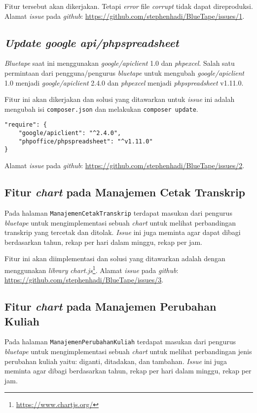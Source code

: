 Fitur tersebut akan dikerjakan. Tetapi \textit{error} file \textit{corrupt} tidak dapat direproduksi. Alamat \textit{issue} pada \textit{github}: \url{https://github.com/stephenhadi/BlueTape/issues/1}. 

\subsection{\textit{Update google api/phpspreadsheet}}
\label{issue:2}
\textit{Bluetape} saat ini menggunakan \textit{google/apiclient} 1.0 dan \textit{phpexcel}. Salah satu permintaan dari pengguna/pengurus \textit{bluetape} untuk mengubah \textit{google/apiclient} 1.0 menjadi \textit{google/apiclient} 2.4.0 dan \textit{phpexcel} menjadi \textit{phpspreadsheet} v1.11.0. 

Fitur ini akan dikerjakan dan solusi yang ditawarkan untuk \textit{issue} ini adalah mengubah isi \texttt{composer.json} dan melakukan \texttt{composer update}.
\begin{lstlisting}
"require": {
	"google/apiclient": "^2.4.0",
	"phpoffice/phpspreadsheet": "^v1.11.0"
}
\end{lstlisting}

Alamat \textit{issue} pada \textit{github}: \url{https://github.com/stephenhadi/BlueTape/issues/2}. 
\subsection{Fitur \textit{chart} pada Manajemen Cetak Transkrip}
\label{issue:3}
Pada halaman \texttt{ManajemenCetakTranskrip} terdapat masukan dari pengurus \textit{bluetape} untuk mengimplementasi sebuah \textit{chart} untuk melihat perbandingan transkrip yang tercetak dan ditolak. \textit{Issue} ini juga meminta agar dapat dibagi berdasarkan tahun, rekap per hari dalam minggu, rekap per jam.

Fitur ini akan diimplementasi dan solusi yang ditawarkan adalah dengan menggunakan \textit{library} \textit{chart.js}\footnote{\label{ft:chartjs}\url{https://www.chartjs.org/}}. Alamat \textit{issue} pada \textit{github}: \url{https://github.com/stephenhadi/BlueTape/issues/3}.

\subsection{Fitur \textit{chart} pada Manajemen Perubahan Kuliah}
\label{issue:4}
Pada halaman \texttt{ManajemenPerubahanKuliah} terdapat masukan dari pengurus \textit{bluetape} untuk mengimplementasi sebuah \textit{chart} untuk melihat perbandingan jenis perubahan kuliah yaitu: diganti, ditadakan, dan tambahan. \textit{Issue} ini juga meminta agar dibagi berdasarkan tahun, rekap per hari dalam minggu, rekap per jam.

